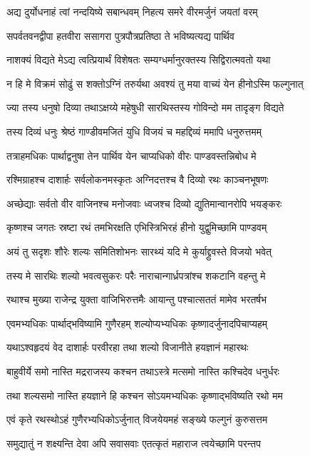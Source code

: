 \twolineshloka
{अद्य दुर्योधनाहं त्वां नन्दयिष्ये सबान्धवम्}
{निहत्य समरे वीरमर्जुनं जयतां वरम्}


\twolineshloka
{सपर्वतवनद्वीपा हतवीरा ससागरा}
{पुत्रपौत्रप्रतिष्ठा ते भविष्यत्यद्य पार्थिव}


\twolineshloka
{नाशक्यं विद्यते मेऽद्य त्वत्प्रियार्थं विशेषतः}
{सम्यग्धर्मानुरक्तस्य सिद्विरात्मवतो यथा}


\twolineshloka
{न हि मे विक्रमं सोढुं स शक्तोऽग्निं तरुर्यथा}
{अवश्यं तु मया वाच्यं येन हीनोऽस्मि फल्गुनात्}


\twolineshloka
{ज्या तस्य धनुषो दिव्या तथाऽक्षय्ये महेषुधी}
{सारथिस्तस्य गोविन्दो मम तादृङ्ग विद्यते}


\twolineshloka
{तस्य दिव्यं धनुः श्रेष्ठं गाण्डीवमजितं युधि}
{विजयं च महद्दिव्यं ममापि धनुरुत्तमम्}


\twolineshloka
{तत्राहमधिकः पार्थाद्वनुषा तेन पार्थिव}
{येन चाप्यधिको वीरः पाण्डवस्तन्निबोध मे}


\twolineshloka
{रश्मिग्राहश्च दाशार्हः सर्वलोकनमस्कृतः}
{अग्निदत्तश्च वै दिव्यो रथः काञ्चनभूषणः}


\twolineshloka
{अच्छेद्याः सर्वतो वीर वाजिनश्च मनोजवाः}
{ध्वजश्च दिव्यो द्युतिमान्वानरोपि भयङ्करः}


\twolineshloka
{कृष्णश्च जगतः स्रष्टा रथं तमभिरक्षति}
{एभिस्त्रिभिरहं हीनो युद्वुमिच्छामि पाण्डवम्}


\twolineshloka
{अयं तु सदृशः शौरेः शल्यः समितिशोभनः}
{सारथ्यं यदि मे कुर्याद्द्रुवस्ते विजयो भवेत्}


\twolineshloka
{तस्य मे सारथिः शल्यो भवत्वसुकरः परैः}
{नाराचान्गार्ध्रपत्रांश्च शकटानि वहन्तु मे}


\twolineshloka
{रथाश्च मुख्या राजेन्द्र युक्ता वाजिभिरुत्तमैः}
{आयान्तु पश्चात्सततं मामेव भरतर्षभ}


\twolineshloka
{एवमभ्यधिकः पार्थाद्भविष्यामि गुणैरहम्}
{शल्योप्यभ्यधिकः कृष्णादर्जुनादपिचाप्यहम्}


\twolineshloka
{यथाऽश्वहृदयं वेद दाशार्हः परवीरहा}
{तथा शल्यो विजानीते हयज्ञानं महारथः}


\twolineshloka
{बाहुवीर्ये समो नास्ति मद्रराजस्य कश्चन}
{तथाऽस्त्रे मत्समो नास्ति कश्चिदेव धनुर्धरः}


\twolineshloka
{तथा शल्यसमो नास्ति हयज्ञाने हि कश्चन}
{सोऽयमभ्यधिकः कृष्णाद्भविष्यति रथो मम}


\twolineshloka
{एवं कृते रथस्थोऽहं गुणैरभ्यधिकोऽर्जुनात्}
{विजयेयमहं सङ्ख्ये फल्गुनं कुरुसत्तम}


\twolineshloka
{समुद्यातुं न शक्ष्यन्ति देवा अपि सवासवाः}
{एतत्कृतं महाराज त्वयेच्छामि परन्तप}


